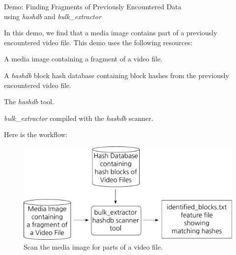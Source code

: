 \documentclass[12pt,twoside]{article}
\newcommand{\hdb}{\emph{hashdb}\xspace}
\newcommand{\bulk}{\emph{bulk\_extractor}\xspace}
\begin{document}
\begin{center}
\Large Demo: Finding Fragments of Previously Encountered Data \\
\large using \hdb and \bulk
\end{center}

In this demo, we find that a media image contains part of a
previously encountered video file.
This demo uses the following resources:
\begin{compactitem}
\item A media image containing a fragment of a video file.
\item A \hdb block hash database containing block hashes
from the previously encountered video file.
\item The \hdb tool.
\item \bulk compiled with the \hdb scanner.
\end{compactitem}

Here is the workflow:

\begin{figure}[H]
  \center
  \includegraphics[scale=0.6]{drawings/scan_hashdb}
  \caption*{Scan the media image for parts of a video file.}
  \label{fig:scan_hashdb}
\end{figure}
\end{document}
